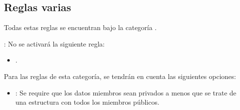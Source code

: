 \subsection{Reglas varias}

Todas estas reglas se encuentran bajo la categoría .

: No se activará la siguiente regla:
\begin{itemize}

\item {}.

\end{itemize}

Para las reglas de esta categoría, se tendrán en cuenta las siguientes
opciones:

\begin{itemize}

\item {}:
Se require que los datos miembros sean privados a menos que se trate de
una estructura con todos los miembros públicos.

\end{itemize}
